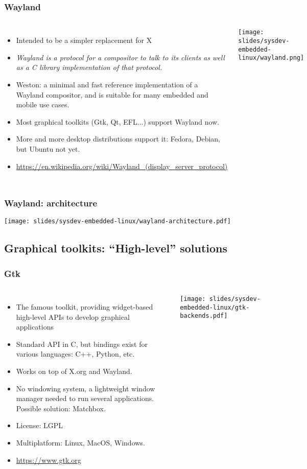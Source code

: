 \begin{frame}
  \frametitle{Wayland}
  \begin{columns}[T]
    \begin{itemize}
    \item Intended to be a simpler replacement for X
    \item {\em Wayland is a protocol for a compositor to talk to
    its clients as well as a C library implementation of that protocol.}
    \item Weston: a minimal and fast reference implementation
          of a Wayland compositor, and is suitable for many embedded
          and mobile use cases.
    \item Most graphical toolkits (Gtk, Qt, EFL...) support Wayland now.
    \item More and more desktop distributions support it: Fedora,
          Debian, but Ubuntu not yet.
    \item \url{https://en.wikipedia.org/wiki/Wayland_(display_server_protocol)}
    \end{itemize}
    \texttt{[image: slides/sysdev-embedded-linux/wayland.png]}
  \end{columns}
\end{frame}

\begin{frame}
  \frametitle{Wayland: architecture}
  \begin{center}
    \texttt{[image: slides/sysdev-embedded-linux/wayland-architecture.pdf]}
  \end{center}
\end{frame}


\subsection[High-level Toolkits]{Graphical toolkits: ``High-level''
  solutions}

\begin{frame}
  \frametitle{Gtk}
  \begin{columns}
    \begin{itemize}
    \item The famous toolkit, providing widget-based high-level APIs to
      develop graphical applications
    \item Standard API in C, but bindings exist for various languages:
      C++, Python, etc.
    \item Works on top of X.org and Wayland.
    \item No windowing system, a lightweight window manager needed to
      run several applications. Possible solution: Matchbox.
    \item License: LGPL
    \item Multiplatform: Linux, MacOS, Windows.
    \item \url{https://www.gtk.org}
    \end{itemize}
    \texttt{[image: slides/sysdev-embedded-linux/gtk-backends.pdf]}
  \end{columns}
\end{frame}

